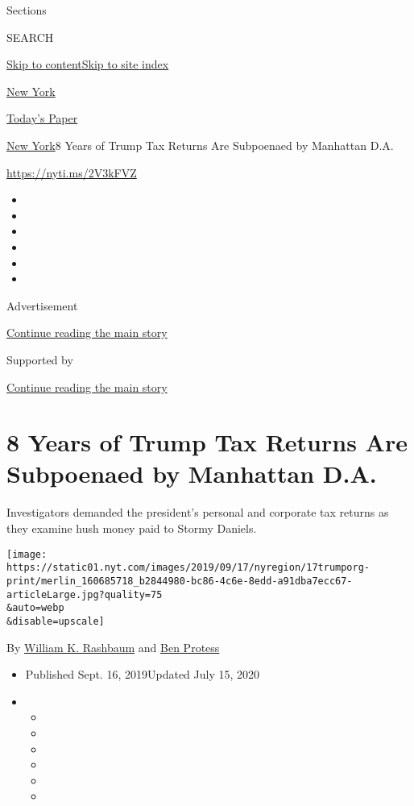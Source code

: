 Sections

SEARCH

\protect\hyperlink{site-content}{Skip to
content}\protect\hyperlink{site-index}{Skip to site index}

\href{https://www.nytimes.com/section/nyregion}{New York}

\href{https://myaccount.nytimes.com/auth/login?response_type=cookie\&client_id=vi}{}

\href{https://www.nytimes.com/section/todayspaper}{Today's Paper}

\href{/section/nyregion}{New York}\textbar{}8 Years of Trump Tax Returns
Are Subpoenaed by Manhattan D.A.

\url{https://nyti.ms/2V3kFVZ}

\begin{itemize}
\item
\item
\item
\item
\item
\item
\end{itemize}

Advertisement

\protect\hyperlink{after-top}{Continue reading the main story}

Supported by

\protect\hyperlink{after-sponsor}{Continue reading the main story}

\hypertarget{8-years-of-trump-tax-returns-are-subpoenaed-by-manhattan-da}{%
\section{8 Years of Trump Tax Returns Are Subpoenaed by Manhattan
D.A.}\label{8-years-of-trump-tax-returns-are-subpoenaed-by-manhattan-da}}

Investigators demanded the president's personal and corporate tax
returns as they examine hush money paid to Stormy Daniels.

\texttt{[image: https://static01.nyt.com/images/2019/09/17/nyregion/17trumporg-print/merlin\_160685718\_b2844980-bc86-4c6e-8edd-a91dba7ecc67-articleLarge.jpg?quality=75\\\&auto=webp\\\&disable=upscale]}

By \href{https://www.nytimes.com/by/william-k-rashbaum}{William K.
Rashbaum} and \href{https://www.nytimes.com/by/ben-protess}{Ben Protess}

\begin{itemize}
\item
  Published Sept. 16, 2019Updated July 15, 2020
\item
  \begin{itemize}
  \item
  \item
  \item
  \item
  \item
  \item
  \end{itemize}
\end{itemize}

